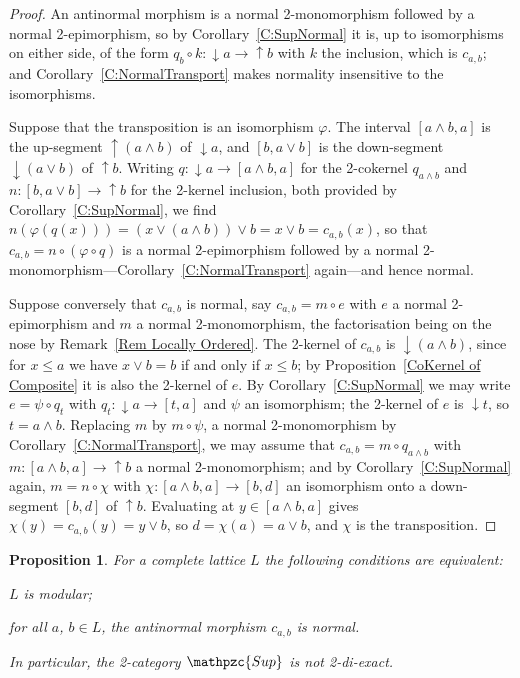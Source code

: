\documentclass[reqno,a4paper]{amsart}
\numberwithin{equation}{section}
\theoremstyle{plain}
\newtheorem{proposition}[subsection]{Proposition}
\theoremstyle{definition}
\def\nameit#1{\textrm{#1}~}
\def\prox{\nameit{Proposition}}
\def\corx{\nameit{Corollary}}
\def\remx{\nameit{Remark}}
\newcommand{\comp}{\circ}
\def\phi{\varphi}
\newcommand{\catfont}[1]{\ensuremath{\mathpzc{#1}}\xspace}
\newcommand{\Sup}{\catfont{Sup}}
\renewcommand{\1}{\onecat{1}}
\newcommand{\dseg}[1]{\ensuremath{{\downarrow}#1}}
\newcommand{\useg}[1]{\ensuremath{{\uparrow}#1}}
\begin{document}
\begin{proof}
	An antinormal morphism is a normal 2-monomorphism followed by a normal 2-epimorphism, so by \corx\ref{C:SupNormal} it is, up to isomorphisms on either side, of the form \(q_{b}\comp k\colon\dseg{a}\to\useg{b}\) with \(k\) the inclusion, which is \(c_{a,b}\); and \corx\ref{C:NormalTransport} makes normality insensitive to the isomorphisms.

	Suppose that the transposition is an isomorphism \(\phi\). The interval \([a\wedge b,a]\) is the up-segment \(\useg{(a\wedge b)}\) of \(\dseg{a}\), and \([b,a\vee b]\) is the down-segment \(\dseg{(a\vee b)}\) of \(\useg{b}\). Writing \(q\colon\dseg{a}\to[a\wedge b,a]\) for the 2-cokernel \(q_{a\wedge b}\) and \(n\colon[b,a\vee b]\to\useg{b}\) for the 2-kernel inclusion, both provided by \corx\ref{C:SupNormal}, we find \(n(\phi(q(x)))=(x\vee(a\wedge b))\vee b=x\vee b=c_{a,b}(x)\), so that \(c_{a,b}=n\comp(\phi\comp q)\) is a normal 2-epimorphism followed by a normal 2-monomorphism---\corx\ref{C:NormalTransport} again---and hence normal.

	Suppose conversely that \(c_{a,b}\) is normal, say \(c_{a,b}=m\comp e\) with \(e\) a normal 2-epimorphism and \(m\) a normal 2-monomorphism, the factorisation being on the nose by \remx\ref{Rem Locally Ordered}. The 2-kernel of \(c_{a,b}\) is \(\dseg{(a\wedge b)}\), since for \(x\leq a\) we have \(x\vee b=b\) if and only if \(x\leq b\); by \prox\ref{CoKernel of Composite} it is also the 2-kernel of \(e\). By \corx\ref{C:SupNormal} we may write \(e=\psi\comp q_{t}\) with \(q_{t}\colon\dseg{a}\to[t,a]\) and \(\psi\) an isomorphism; the 2-kernel of \(e\) is \(\dseg{t}\), so \(t=a\wedge b\). Replacing \(m\) by \(m\comp\psi\), a normal 2-monomorphism by \corx\ref{C:NormalTransport}, we may assume that \(c_{a,b}=m\comp q_{a\wedge b}\) with \(m\colon[a\wedge b,a]\to\useg{b}\) a normal 2-monomorphism; and by \corx\ref{C:SupNormal} again, \(m=n\comp\chi\) with \(\chi\colon[a\wedge b,a]\to[b,d]\) an isomorphism onto a down-segment \([b,d]\) of \(\useg{b}\). Evaluating at \(y\in[a\wedge b,a]\) gives \(\chi(y)=c_{a,b}(y)=y\vee b\), so \(d=\chi(a)=a\vee b\), and \(\chi\) is the transposition.
\end{proof}

\begin{proposition}\label{P:SupModular}
	For a complete lattice \(L\) the following conditions are equivalent:
	\begin{tfae}
		\item \(L\) is modular;
		\item for all \(a\), \(b\in L\), the antinormal morphism \(c_{a,b}\) is normal.
	\end{tfae}
	In particular, the 2-category \(\Sup\) is not 2-di-exact.
\end{proposition}
\end{document}
